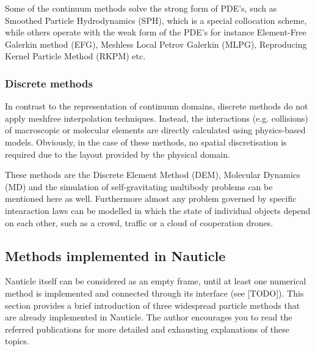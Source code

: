 \documentclass[a4paper,12pt,openany]{book}
\theoremstyle{break}
\begin{document}
Some of the continuum methods solve the strong form of PDE's, such as Smoothed Particle Hydrodynamics (SPH), which is a special collocation scheme, while others operate with the weak form of the PDE's for instance Element-Free Galerkin method (EFG), Meshless Local Petrov Galerkin (MLPG), Reproducing Kernel Particle Method (RKPM) etc.
\subsubsection{Discrete methods}
In contrast to the representation of continuum domains, discrete methods do not apply meshfree interpolation techniques. Instead, the interactions (e.g. collisions) of macroscopic or molecular elements are directly calculated using physics-based models. Obviously, in the case of these methods, no spatial discretisation is required due to the layout provided by the physical domain.

These methods are the Discrete Element Method (DEM), Molecular Dynamics (MD) and the simulation of self-gravitating multibody problems can be mentioned here as well. Furthermore almost any problem governed by specific intearaction laws can be modelled in which the state of individual objects depend on each other, such as a crowd, traffic or a cloud of cooperation drones.

\subsection{Methods implemented in Nauticle} \label{sec:implemented}
Nauticle itself can be considered as an empty frame, until at least one numerical method is implemented and connected through its interface (see [TODO]). This section provides a brief introduction of three widespread particle methods that are already implemented in Nauticle. The author encourages you to read the referred publications for more detailed and exhausting explanations of these topics.
\end{document}
